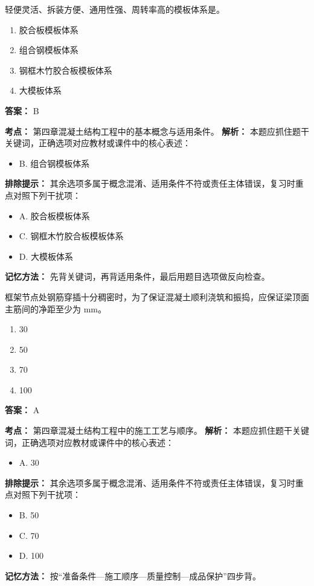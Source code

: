 \documentclass[UTF8,fontset=fandol,11pt]{ctexart}
\begin{document}
\vspace{0.2em}

\begin{quizbox}[title={第 24 题}]
轻便灵活、拆装方便、通用性强、周转率高的模板体系是。\\
\begin{enumerate}[label=\Alph*.]
\item 胶合板模板体系
\item 组合钢模板体系
\item 钢框木竹胶合板模板体系
\item 大模板体系
\end{enumerate}
\textbf{答案：} B
\vspace{0.25em}
\begin{answerbox}[title={考点解析}]
\textbf{考点：} 第四章混凝土结构工程中的基本概念与适用条件。
\textbf{解析：} 本题应抓住题干关键词，正确选项对应教材或课件中的核心表述：
\begin{itemize}
\item B. 组合钢模板体系
\end{itemize}
\textbf{排除提示：} 其余选项多属于概念混淆、适用条件不符或责任主体错误，复习时重点对照下列干扰项：
\begin{itemize}
\item A. 胶合板模板体系
\item C. 钢框木竹胶合板模板体系
\item D. 大模板体系
\end{itemize}
\textbf{记忆方法：} 先背关键词，再背适用条件，最后用题目选项做反向检查。
\end{answerbox}
\end{quizbox}

\vspace{0.2em}

\begin{quizbox}[title={第 25 题}]
框架节点处钢筋穿插十分稠密时，为了保证混凝土顺利浇筑和振捣，应保证梁顶面主筋间的净距至少为 mm。\\
\begin{enumerate}[label=\Alph*.]
\item 30
\item 50
\item 70
\item 100
\end{enumerate}
\textbf{答案：} A
\vspace{0.25em}
\begin{answerbox}[title={考点解析}]
\textbf{考点：} 第四章混凝土结构工程中的施工工艺与顺序。
\textbf{解析：} 本题应抓住题干关键词，正确选项对应教材或课件中的核心表述：
\begin{itemize}
\item A. 30
\end{itemize}
\textbf{排除提示：} 其余选项多属于概念混淆、适用条件不符或责任主体错误，复习时重点对照下列干扰项：
\begin{itemize}
\item B. 50
\item C. 70
\item D. 100
\end{itemize}
\textbf{记忆方法：} 按“准备条件—施工顺序—质量控制—成品保护”四步背。
\end{answerbox}
\end{quizbox}
\end{document}
